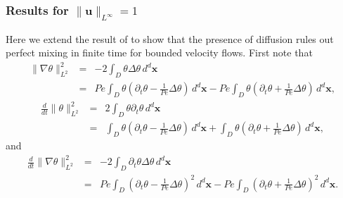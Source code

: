 \documentclass[12pt]{iopart}
\newcommand{\ddt}[1]{\frac{d #1}{dt}}
\newcommand{\ltwo}[1]{\|#1\|_{L^{2}}}
\newcommand{\hone}[1]{\| \nabla #1\|_{L^{2}}}
\newcommand{\sint}[1]{\int_{D} #1 \, d^{d}\mathbf{x}}
\newcommand{\linf}[1]{\| #1 \|_{L^{\infty}}}
\renewcommand{\u}{\mathbf{u}}
\newcommand{\ppt}[1]{\partial_{t} #1}
\newcommand{\lap}{\Delta }
\begin{document}
\subsubsection{Results for $\linf{\u}= 1$}
Here we extend the result of \cite{Chi-Cheu1996} to show that the presence of diffusion rules out perfect mixing in finite time for bounded velocity flows.  First note that
%
\begin{eqnarray*}
	 \hone{\theta}^2 &=& - 2\sint{\theta \lap \theta} \\
	 							&=& Pe \sint{\theta\left(\ppt{\theta}
	 									-\frac{1}{Pe}\lap \theta\right)} 
	 									-Pe \sint{\theta\left(\ppt{\theta}
	 									+\frac{1}{Pe}\lap \theta\right)},
\end{eqnarray*}
%
\begin{eqnarray*}
	\ddt{}\ltwo{\theta}^2 &=& 2\sint{\theta\ppt{\theta}} \\
										 &=&\sint{\theta\left(\ppt{\theta}
	 									-\frac{1}{Pe}\lap \theta\right)} 
										 + \sint{\theta\left(\ppt{\theta}
	 									+\frac{1}{Pe}\lap \theta\right)} ,
\end{eqnarray*}
%
and
%
\begin{eqnarray*}
	\ddt{}\hone{\theta}^2 &=& -2\sint{\ppt{\theta}\lap \theta} \\
	 									&=& Pe \sint{\left(\ppt{\theta}
	 									-\frac{1}{Pe}\lap \theta\right)^2} 
	 									-Pe \sint{\left(\ppt{\theta}
	 									+\frac{1}{Pe}\lap \theta\right)^2} .
\end{eqnarray*}
\end{document}
